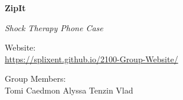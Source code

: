 \documentclass[11pt,a4paper]{article}
\begin{document}
\vspace*{\fill}

\begin{center}

{\Huge\bfseries ZipIt}

\vspace{2cm}

{\Large\itshape Shock Therapy Phone Case}

\vspace{3cm}

{\large Website:}\\[0.5em]
{\large \url{https://splixent.github.io/2100-Group-Website/}}

\vspace{3cm}

{\large Group Members:}\\[1em]
{\Large Tomi \quad Caedmon \quad Alyssa \quad Tenzin \quad Vlad}

\end{center}

\vspace*{\fill}
\end{document}
